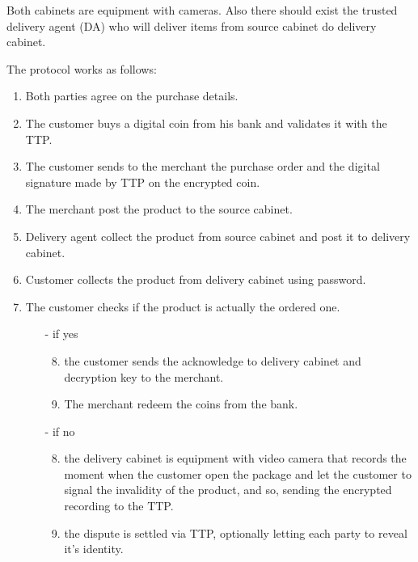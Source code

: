 \documentclass{article}
\begin{document}
Both cabinets are equipment with cameras. Also there should exist the trusted delivery agent (DA) who will deliver items from source cabinet do delivery cabinet. 

The protocol works as follows:
\begingroup
\renewcommand{\labelenumii}{\arabic{enumii}.}
\begin{enumerate}
    \item Both parties agree on the purchase details.
    \item The customer buys a digital coin from his bank and validates it with the TTP.
    \item The customer sends to the merchant the purchase order and the digital signature made by TTP on the encrypted coin.
    \item The merchant post the product to the source cabinet.
    \item Delivery agent collect the product from source cabinet and post it to delivery cabinet.
    \item Customer collects the product from delivery cabinet using password.
    \item The customer checks if the product is actually the ordered one.
    \begin{itemize}
    \item[-] if yes 
        \begin{enumerate}
        \setcounter{enumii}{7}
        \item the customer sends the acknowledge to delivery cabinet and decryption key to the merchant.
        \item The merchant redeem the coins from the bank.
        \end{enumerate}
    \item[-] if no
        \begin{enumerate}
        \setcounter{enumii}{7}
        \item the delivery cabinet is equipment with video camera that records the moment when the customer open the package and let the customer to signal the invalidity of the product, and so, sending the encrypted recording to the TTP. 
        \item the dispute is settled via TTP, optionally letting each party to reveal it's identity.
    \end{enumerate}
    \end{itemize}
\end{enumerate}
\endgroup
\end{document}
